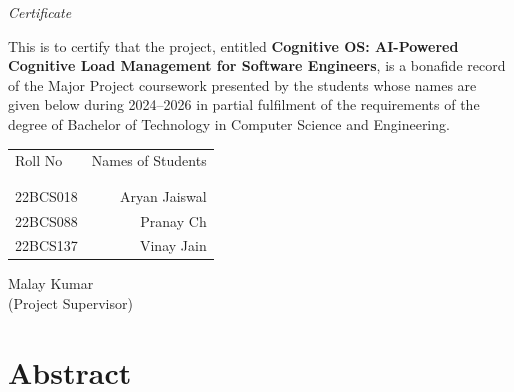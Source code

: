 \documentclass[12pt]{article}
\begin{document}
\begin{center}
	
	\emph{\huge{Certificate}}\\[2.5cm]
\end{center}
\normalsize This is to certify that the project, entitled \textbf{Cognitive OS: AI-Powered Cognitive Load Management for Software Engineers}, is a bonafide record of the Major Project coursework presented by the students whose names are given below during 2024--2026 in partial fulfilment of the requirements of the degree of Bachelor of Technology in Computer Science and Engineering.\\[1.0cm]

\begin{table}[h]
	\centering
	\begin{tabular}{lr}
		Roll No & Names of Students \\ \\ \hline
		\\
		22BCS018 & Aryan Jaiswal \\ 
		22BCS088 & Pranay Ch \\ 
		22BCS137 & Vinay Jain \\ 
	\end{tabular}
\end{table}

\vfill

\begin{flushright}
	Malay Kumar\\
	(Project Supervisor)\\[1.5cm]
\end{flushright}

\newpage
{}
\setcounter{page}{1}

\section*{Abstract}
\end{document}
